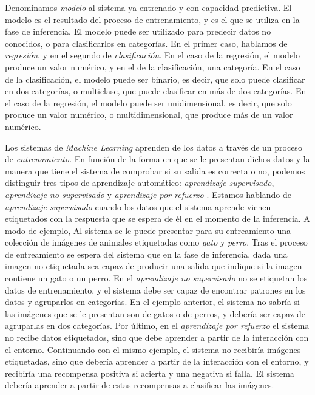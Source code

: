 Denominamos \textit{modelo} al sistema ya entrenado y con capacidad predictiva. El modelo es el resultado del proceso de entrenamiento, y es el que se utiliza en la fase de inferencia. El modelo puede ser utilizado para predecir datos no conocidos, o para clasificarlos en categorías. En el primer caso, hablamos de \textit{regresión}, y en el segundo de \textit{clasificación}. En el caso de la regresión, el modelo produce un valor numérico, y en el de la clasificación, una categoría. En el caso de la clasificación, el modelo puede ser binario, es decir, que solo puede clasificar en dos categorías, o multiclase, que puede clasificar en más de dos categorías. En el caso de la regresión, el modelo puede ser unidimensional, es decir, que solo produce un valor numérico, o multidimensional, que produce más de un valor numérico.


Los sistemas de \textit{Machine Learning} aprenden de los datos a través de un proceso de \textit{entrenamiento}. En función de la forma en que se le presentan dichos datos y la manera que tiene el sistema de comprobar si su salida es correcta o no, podemos distinguir tres tipos de aprendizaje automático: \textit{aprendizaje supervisado}, \textit{aprendizaje no supervisado} y \textit{aprendizaje por refuerzo} \citep[p. ~38]{torresivinalsPythonDeepLearning2020}. Estamos hablando de \textit{aprendizaje supervisado} cuando los datos que el sistema aprende vienen etiquetados con la respuesta que se espera de él en el momento de la inferencia. A modo de ejemplo, Al sistema se le puede presentar para su entreamiento una colección de imágenes de animales etiquetadas como \textit{gato} y \textit{perro}. Tras el proceso de entreamiento se espera del sistema que en la fase de inferencia, dada una imagen no etiquetada sea capaz de producir una salida que indique si la imagen contiene un gato o un perro. En el \textit{aprendizaje no supervisado} no se etiquetan los datos de entrenamiento, y el sistema debe ser capaz de encontrar patrones en los datos y agruparlos en categorías. En el ejemplo anterior, el sistema no sabría si las imágenes que se le presentan son de gatos o de perros, y debería ser capaz de agruparlas en dos categorías. Por último, en el \textit{aprendizaje por refuerzo} el sistema no recibe datos etiquetados, sino que debe aprender a partir de la interacción con el entorno. Continuando con el mismo ejemplo, el sistema no recibiría imágenes etiquetadas, sino que debería aprender a partir de la interacción con el entorno, y recibiría una recompensa positiva si acierta y una negativa si falla. El sistema debería aprender a partir de estas recompensas a clasificar las imágenes.


